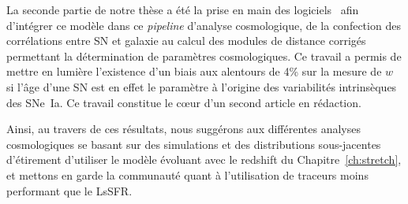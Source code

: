 \documentclass[../main/main.tex]{subfiles}
\begin{document}
La seconde partie de notre thèse a été la prise en main des logiciels \snana\
afin d'intégrer ce modèle dans ce \textit{pipeline} d'analyse cosmologique, de
la confection des corrélations entre SN et galaxie au calcul des modules de
distance corrigés permettant la détermination de paramètres cosmologiques. Ce
travail a permis de mettre en lumière l'existence d'un biais aux alentours de
4\% sur la mesure de $w$ si l'âge d'une SN est en effet le paramètre à l'origine
des variabilités intrinsèques des SNe~Ia. Ce travail constitue le cœur d'un
second article en rédaction.

Ainsi, au travers de ces résultats, nous suggérons aux différentes analyses
cosmologiques se basant sur des simulations et des distributions sous-jacentes
d'étirement d'utiliser le modèle évoluant avec le redshift du
Chapitre~\ref{ch:stretch}, et mettons en garde la communauté quant à
l'utilisation de traceurs moins performant que le LsSFR.

% 
% 
\end{document}
